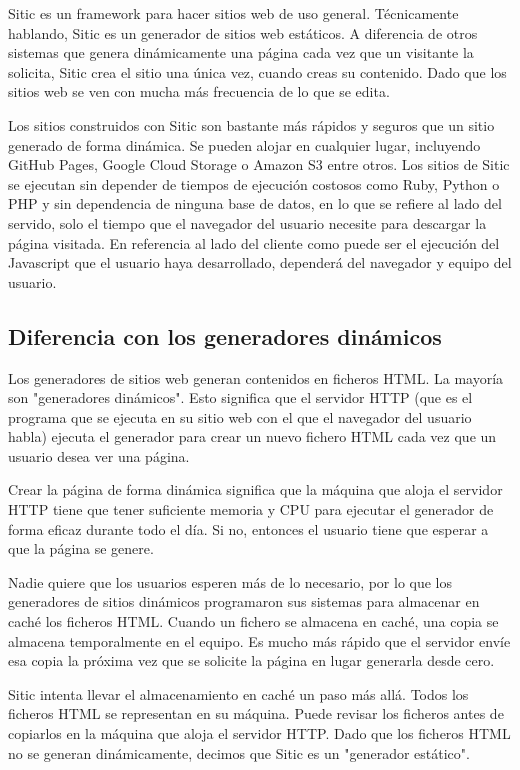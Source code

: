 \documentclass[a4paper,12pt]{article}
\begin{document}
Sitic es un framework para hacer sitios web de uso general. Técnicamente hablando, Sitic es un generador de sitios web estáticos.
A diferencia de otros sistemas que genera dinámicamente una página cada vez que un visitante la solicita, Sitic crea el sitio
una única vez,
cuando creas su contenido. Dado que los sitios web se ven con mucha más frecuencia de lo que se edita.

Los sitios construidos con Sitic son bastante más rápidos y seguros que un sitio generado de forma dinámica.
Se pueden alojar en cualquier lugar, incluyendo GitHub Pages, Google Cloud Storage o Amazon
S3 entre otros. Los sitios de Sitic se ejecutan sin depender de tiempos de ejecución costosos como Ruby, Python
o PHP y sin dependencia de ninguna base de datos, en lo que se refiere al lado del servido, solo el tiempo
que el navegador del usuario necesite para descargar la página visitada. En referencia al lado
del cliente como puede ser el ejecución del Javascript que el usuario haya desarrollado, dependerá del navegador y
equipo del usuario.

\subsection{Diferencia con los generadores dinámicos}

Los generadores de sitios web generan contenidos en ficheros HTML. La mayoría son "generadores dinámicos".
Esto significa que el servidor HTTP (que es el programa que se ejecuta en su sitio web con el que el navegador del
usuario habla) ejecuta el generador para crear un nuevo fichero HTML cada vez que un usuario desea ver una página.

Crear la página de forma dinámica significa que la máquina que aloja el servidor HTTP tiene que tener suficiente
memoria y CPU para ejecutar el generador de forma eficaz durante todo el día. Si no, entonces el usuario tiene que
esperar a que la página se genere.

Nadie quiere que los usuarios esperen más de lo necesario, por lo que los generadores de sitios dinámicos programaron
sus sistemas para almacenar en caché los ficheros HTML. Cuando un fichero se almacena en caché, una copia se
almacena temporalmente en el equipo. Es mucho más rápido que el servidor envíe esa copia la próxima vez que
se solicite la página en lugar generarla desde cero.

Sitic intenta llevar el almacenamiento en caché un paso más allá. Todos los ficheros HTML se representan en su máquina.
Puede revisar los ficheros antes de copiarlos en la máquina que aloja el servidor HTTP. Dado que los ficheros HTML
no se generan dinámicamente, decimos que Sitic es un "generador estático".
\end{document}
